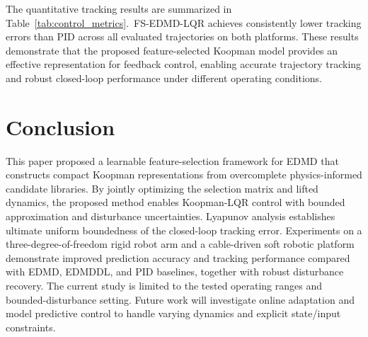 The quantitative tracking results are summarized in Table~\ref{tab:control_metrics}.\footnotemark\ FS-EDMD-LQR achieves consistently lower tracking errors than PID across all evaluated trajectories on both platforms. These results demonstrate that the proposed feature-selected Koopman model provides an effective representation for feedback control, enabling accurate trajectory tracking and robust closed-loop performance under different operating conditions.



\section{Conclusion}
\label{sec:conclusion}

This paper proposed a learnable feature-selection framework for EDMD that constructs compact Koopman representations from overcomplete physics-informed candidate libraries. By jointly optimizing the selection matrix and lifted dynamics, the proposed method enables Koopman-LQR control with bounded approximation and disturbance uncertainties. Lyapunov analysis establishes ultimate uniform boundedness of the closed-loop tracking error. Experiments on a three-degree-of-freedom rigid robot arm and a cable-driven soft robotic platform demonstrate improved prediction accuracy and tracking performance compared with EDMD, EDMDDL, and PID baselines, together with robust disturbance recovery. The current study is limited to the tested operating ranges and bounded-disturbance setting. Future work will investigate online adaptation and model predictive control to handle varying dynamics and explicit state/input constraints.




